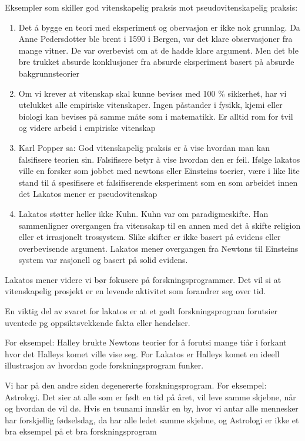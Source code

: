 \documentclass[11pt]{article}
\begin{document}
Eksempler som skiller god vitenskapelig praksis mot pseudovitenskapelig praksis:
\begin{enumerate}
    \item Det å bygge en teori med eksperiment og obervasjon er ikke nok grunnlag. Da Anne Pedersdotter ble brent i 1590 i Bergen, var det klare observasjoner fra mange vitner. De var overbevist om at de hadde klare argument. Men det ble bre trukket absurde konklusjoner fra absurde eksperiment basert på absurde bakgrunnsteorier
    \item Om vi krever at vitenskap skal kunne bevises med  100 $\%$ sikkerhet, har vi utelukket  alle  empiriske vitenskaper. Ingen påstander i fysikk, kjemi eller biologi kan bevises på samme måte som i matematikk. Er alltid rom for tvil og videre arbeid i empiriske vitenskap
    \item Karl Popper sa: God vitenskapelig praksis er å vise hvordan man kan falsifisere teorien sin. Falsifisere betyr å vise hvordan den er feil. Ifølge lakatos ville en forsker som jobbet med newtons eller Einsteins toerier, være i like lite stand til å spesifisere et falsifiserende eksperiment som en som arbeidet innen det Lakatos mener er pseudovitenskap
    \item Lakatos støtter heller ikke Kuhn. Kuhn var om paradigmeskifte. Han sammenligner overgangen fra vitensakap til en annen med det å skifte religion eller et irrasjonelt trossystem. Slike skifter er ikke basert på evidens eller overbevisende argument. Lakatos mener overgangen fra Newtons til Einsteins system var rasjonell og basert på solid evidens.
\end{enumerate}


\vspace{1em}
Lakatos mener videre vi bør fokusere på forskningsprogrammer. Det vil si at vitenskapelig prosjekt er en levende aktivitet som forandrer seg over tid.

En viktig del av svaret for lakatos  er at et godt forskningsprogram forutsier uventede pg oppsiktsvekkende fakta eller hendelser.

For eksempel: Halley brukte Newtons teorier for å forutsi mange tiår i forkant hvor det Halleys komet ville vise seg. For Lakatos er Halleys komet en ideell illustrasjon av hvordan gode forskningsprogram funker.

\vspace{1em}
Vi har på den andre siden degenererte forskningsprogram. For eksempel: Astrologi. Det sier at alle som er født en tid på året, vil leve samme skjebne, når og hvordan de vil dø. Hvis en tsunami innslår en by, hvor vi antar alle mennesker har forskjellig fødselsdag, da har alle ledet samme skjebne, og Astrologi er ikke et bra eksempel på et bra forskningsprogram
\end{document}
